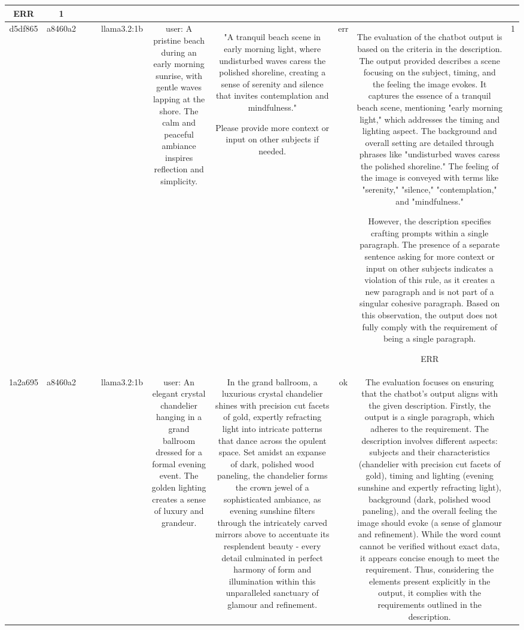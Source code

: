 \begin{table}[h!]
\begin{tabular}{|c|c|c|c|c|c|c|c|c|c|}
ERR & 1\\
\hline
d5df865 & a8460a2 &  &  & llama3.2:1b & user: A pristine beach during an early morning sunrise, with gentle waves lapping at the shore. The calm and peaceful ambiance inspires reflection and simplicity. & "A tranquil beach scene in early morning light, where undisturbed waves caress the polished shoreline, creating a sense of serenity and silence that invites contemplation and mindfulness."

Please provide more context or input on other subjects if needed. & err & The evaluation of the chatbot output is based on the criteria in the description. The output provided describes a scene focusing on the subject, timing, and the feeling the image evokes. It captures the essence of a tranquil beach scene, mentioning "early morning light," which addresses the timing and lighting aspect. The background and overall setting are detailed through phrases like "undisturbed waves caress the polished shoreline." The feeling of the image is conveyed with terms like "serenity," "silence," "contemplation," and "mindfulness."

However, the description specifies crafting prompts within a single paragraph. The presence of a separate sentence asking for more context or input on other subjects indicates a violation of this rule, as it creates a new paragraph and is not part of a singular cohesive paragraph. Based on this observation, the output does not fully comply with the requirement of being a single paragraph.

ERR & 1\\
\hline
1a2a695 & a8460a2 &  &  & llama3.2:1b & user: An elegant crystal chandelier hanging in a grand ballroom dressed for a formal evening event. The golden lighting creates a sense of luxury and grandeur. & In the grand ballroom, a luxurious crystal chandelier shines with precision cut facets of gold, expertly refracting light into intricate patterns that dance across the opulent space. Set amidst an expanse of dark, polished wood paneling, the chandelier forms the crown jewel of a sophisticated ambiance, as evening sunshine filters through the intricately carved mirrors above to accentuate its resplendent beauty - every detail culminated in perfect harmony of form and illumination within this unparalleled sanctuary of glamour and refinement. & ok & The evaluation focuses on ensuring that the chatbot's output aligns with the given description. Firstly, the output is a single paragraph, which adheres to the requirement. The description involves different aspects: subjects and their characteristics (chandelier with precision cut facets of gold), timing and lighting (evening sunshine and expertly refracting light), background (dark, polished wood paneling), and the overall feeling the image should evoke (a sense of glamour and refinement). While the word count cannot be verified without exact data, it appears concise enough to meet the requirement. Thus, considering the elements present explicitly in the output, it complies with the requirements outlined in the description.


\end{tabular}
\end{table}
